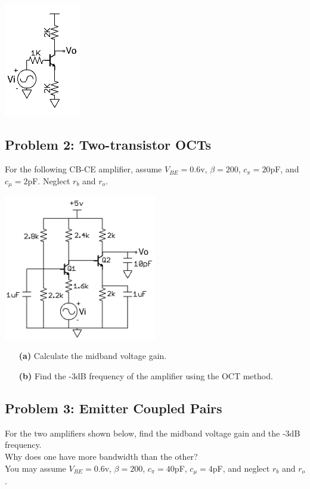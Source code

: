 \documentclass[11pt,twoside]{article}
\begin{document}
\begin{enumerate}
\begin{center}
\hspace{2in}
\includegraphics[width=0.25\textwidth]{ceed.png}
\end{center}
\begin{center}
\end{center}
\end{enumerate}

\subsection*{Problem 2: Two-transistor OCTs}
For the following CB-CE amplifier, assume $V_{BE}=0.6$v, $\beta=200$, $c_\pi=20$pF, and $c_\mu=2$pF.
Neglect $r_b$ and $r_o$.

\begin{center}
\includegraphics[width=0.5\textwidth]{cb-ce.png}
\end{center}

\begin{enumerate}
	\item[\bf(a)] Calculate the midband voltage gain.
	\item[\bf(b)] Find the -3dB frequency of the amplifier using the OCT method.
\end{enumerate}

\subsection*{Problem 3: Emitter Coupled Pairs}
For the two amplifiers shown below, find the midband voltage gain and the -3dB frequency. \\
Why does one have more bandwidth than the other? \\
You may assume $V_{BE}=0.6$v, $\beta=200$, $c_\pi=40$pF, $c_\mu=4$pF, and neglect $r_b$ and $r_o$.
\end{document}
